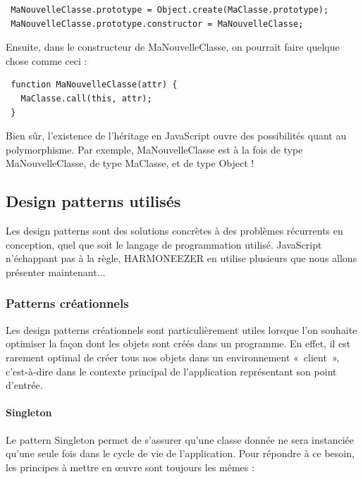 \documentclass[a4paper,12pt]{article}
\begin{document}
\vspace{7pt}

\begin{lstlisting}
 MaNouvelleClasse.prototype = Object.create(MaClasse.prototype);
 MaNouvelleClasse.prototype.constructor = MaNouvelleClasse;
\end{lstlisting}

Ensuite, dans le constructeur de MaNouvelleClasse, on pourrait faire quelque chose comme ceci :

\vspace{7pt}

\begin{lstlisting}
 function MaNouvelleClasse(attr) {
   MaClasse.call(this, attr);
 }
\end{lstlisting}

Bien sûr, l'existence de l'héritage en JavaScript ouvre des possibilités quant au polymorphisme. Par exemple, MaNouvelleClasse est à la fois de type MaNouvelleClasse, de type MaClasse, et de type Object !

\subsection{Design patterns utilisés}

Les design patterns sont des solutions concrètes à des problèmes récurrents en conception, quel que soit le langage de programmation utilisé. JavaScript n'échappant pas à la règle, HARMONEEZER en utilise plusieurs que nous allons présenter maintenant...

\subsubsection{Patterns créationnels}

Les design patterns créationnels sont particulièrement utiles lorsque l'on souhaite optimiser la façon dont les objets sont créés dans un programme. En effet, il est rarement optimal de créer tous nos objets dans un environnement «~client~», c'est-à-dire dans le contexte principal de l'application représentant son point d'entrée.

\paragraph{Singleton}

Le pattern Singleton permet de s'assurer qu'une classe donnée ne sera instanciée qu'une seule fois dans le cycle de vie de l'application. Pour répondre à ce besoin, les principes à mettre en œuvre sont toujours les mêmes :
\end{document}
